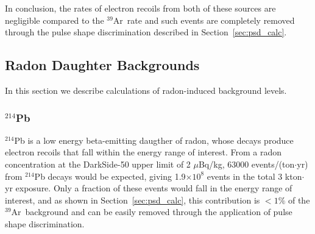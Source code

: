 \documentclass[a4paper,11pt]{article}
\newcommand{\rs}[1]{{\tt \color{purple}#1}}
\newcommand{\artn}{$^{39}$Ar}
\begin{document}
In conclusion, the rates of electron recoils from both of these sources are negligible compared to the \artn~rate and such events are completely removed through the pulse shape discrimination described in Section~\ref{sec:psd_calc}.



\subsection{Radon Daughter Backgrounds}
\label{sec:radon_calc}

In this section we describe calculations of radon-induced background levels.

\subsubsection{$^{214}$Pb}
$^{214}$Pb is a low energy beta-emitting daugther of radon, whose decays produce electron recoils that fall within the energy range of interest. From a radon concentration at the DarkSide-50 upper limit of 2 $\mu$Bq/kg, 63000 events/(ton$\cdot$yr) from $^{214}$Pb decays would be expected, giving 1.9$\times10^8$ events in the total 3 kton$\cdot$yr exposure. Only a fraction of these events would fall in the energy range of interest, and as shown in Section~\ref{sec:psd_calc}, this contribution is $<1\%$ of the \artn~background and can be easily removed through the application of pulse shape discrimination.
\end{document}
